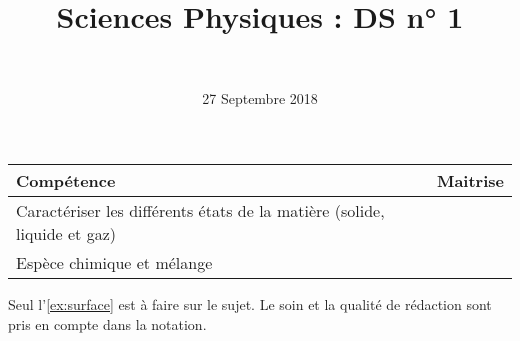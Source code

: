 \documentclass[a4paper,11pt]{exam}
\author{\ }
\date{27 Septembre 2018}
\title{Sciences Physiques : DS n° 1}
\begin{document}
%	

	\maketitle
	
\begin{small}
	\begin{center}
		\begin{tabular}{|@{\ }l@{}|@{\ }c@{\ }|}
			\hline
			\textbf{Compétence} & \textbf{Maitrise} \\
			\hline
			Caractériser les différents états de la matière (solide, liquide et gaz)\ &  \ \ \ \\
			\hline	
			Espèce chimique et mélange\ &  \ \ \ \\
			\hline
		\end{tabular}
	\end{center}
\end{small}	
	
	

%

%

Seul l'\ref{ex:surface} est à faire sur le sujet. Le soin et la qualité de rédaction sont pris en compte dans la notation.




















%


%




 
%
\ \label{LastPage}
\end{document}
